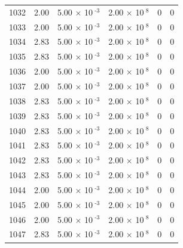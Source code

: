 \documentclass[a4paper,11pt]{article}
\begin{document}
\begin{center}
\begin{longtable}{|R{1.5cm}|R{2.4cm}|R{2.4cm}|R{2.4cm}|R{2.4cm}|R{2.4cm}|}
 1032 &   2.00  &         5.00 $\times$ 10$^{\text{          -3}}$  &         2.00 $\times$ 10$^{\text{           8}}$  & 0  & 0 \\
 1033 &   2.00  &         5.00 $\times$ 10$^{\text{          -3}}$  &         2.00 $\times$ 10$^{\text{           8}}$  & 0  & 0 \\
 1034 &   2.83  &         5.00 $\times$ 10$^{\text{          -3}}$  &         2.00 $\times$ 10$^{\text{           8}}$  & 0  & 0 \\
 1035 &   2.83  &         5.00 $\times$ 10$^{\text{          -3}}$  &         2.00 $\times$ 10$^{\text{           8}}$  & 0  & 0 \\
 1036 &   2.00  &         5.00 $\times$ 10$^{\text{          -3}}$  &         2.00 $\times$ 10$^{\text{           8}}$  & 0  & 0 \\
 1037 &   2.00  &         5.00 $\times$ 10$^{\text{          -3}}$  &         2.00 $\times$ 10$^{\text{           8}}$  & 0  & 0 \\
 1038 &   2.83  &         5.00 $\times$ 10$^{\text{          -3}}$  &         2.00 $\times$ 10$^{\text{           8}}$  & 0  & 0 \\
 1039 &   2.83  &         5.00 $\times$ 10$^{\text{          -3}}$  &         2.00 $\times$ 10$^{\text{           8}}$  & 0  & 0 \\
 1040 &   2.83  &         5.00 $\times$ 10$^{\text{          -3}}$  &         2.00 $\times$ 10$^{\text{           8}}$  & 0  & 0 \\
 1041 &   2.83  &         5.00 $\times$ 10$^{\text{          -3}}$  &         2.00 $\times$ 10$^{\text{           8}}$  & 0  & 0 \\
 1042 &   2.83  &         5.00 $\times$ 10$^{\text{          -3}}$  &         2.00 $\times$ 10$^{\text{           8}}$  & 0  & 0 \\
 1043 &   2.83  &         5.00 $\times$ 10$^{\text{          -3}}$  &         2.00 $\times$ 10$^{\text{           8}}$  & 0  & 0 \\
 1044 &   2.00  &         5.00 $\times$ 10$^{\text{          -3}}$  &         2.00 $\times$ 10$^{\text{           8}}$  & 0  & 0 \\
 1045 &   2.00  &         5.00 $\times$ 10$^{\text{          -3}}$  &         2.00 $\times$ 10$^{\text{           8}}$  & 0  & 0 \\
 1046 &   2.00  &         5.00 $\times$ 10$^{\text{          -3}}$  &         2.00 $\times$ 10$^{\text{           8}}$  & 0  & 0 \\
 1047 &   2.83  &         5.00 $\times$ 10$^{\text{          -3}}$  &         2.00 $\times$ 10$^{\text{           8}}$  & 0  & 0 \\

\end{longtable}
\end{center}
\end{document}
